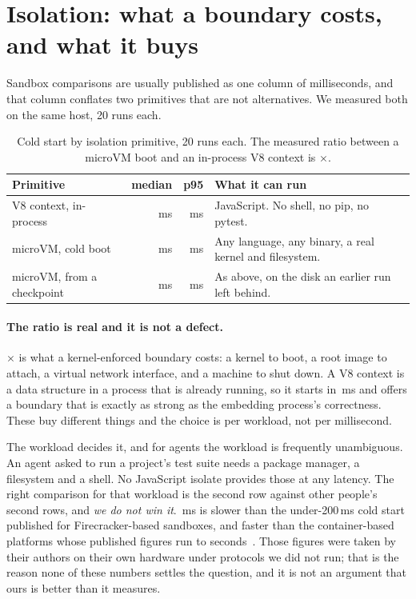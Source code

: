 \section{Isolation: what a boundary costs, and what it buys}
\label{sec:isolation}

Sandbox comparisons are usually published as one column of milliseconds, and
that column conflates two primitives that are not alternatives. We measured both
on the same host, 20 runs each.

\begin{table}[h]
\centering
\begin{tabular}{lrrl}
\toprule
\textbf{Primitive} & \textbf{median} & \textbf{p95} & \textbf{What it can run} \\
\midrule
V8 context, in-process   & \rVeight{}\,ms  & \rVeightP{}\,ms  & JavaScript. No shell, no pip, no pytest. \\
microVM, cold boot       & \rVm{}\,ms      & \rVmP{}\,ms      & Any language, any binary, a real kernel and filesystem. \\
microVM, from a checkpoint & \rVmCkpt{}\,ms & \rVmCkptP{}\,ms & As above, on the disk an earlier run left behind. \\
\bottomrule
\end{tabular}
\caption{Cold start by isolation primitive, 20 runs each. The measured ratio
between a microVM boot and an in-process V8 context is
\rVmRatio{}$\times$.}
\label{tab:sandbox}
\end{table}

\paragraph{The ratio is real and it is not a defect.}
\rVmRatio{}$\times$ is what a kernel-enforced boundary costs: a kernel to boot,
a root image to attach, a virtual network interface, and a machine to shut down. A V8 context
is a data structure in a process that is already running, so it starts in
\rVeight{}\,ms and offers a boundary that is exactly as strong as the embedding
process's correctness. These buy different things and the choice is per workload,
not per millisecond.

The workload decides it, and for agents the workload is frequently unambiguous.
An agent asked to run a project's test suite needs a package manager, a
filesystem and a shell. No JavaScript isolate provides those at any latency. The
right comparison for that workload is the second row against other people's
second rows, and \emph{we do not win it}. \rVm{}\,ms is slower than the
under-200\,ms cold start published for Firecracker-based sandboxes, and faster
than the container-based platforms whose published figures run to
seconds~\cite{e2b,modal,cfworkers}. Those figures were taken by their authors on
their own hardware under protocols we did not run; that is the reason none of
these numbers settles the question, and it is not an argument that ours is
better than it measures.

